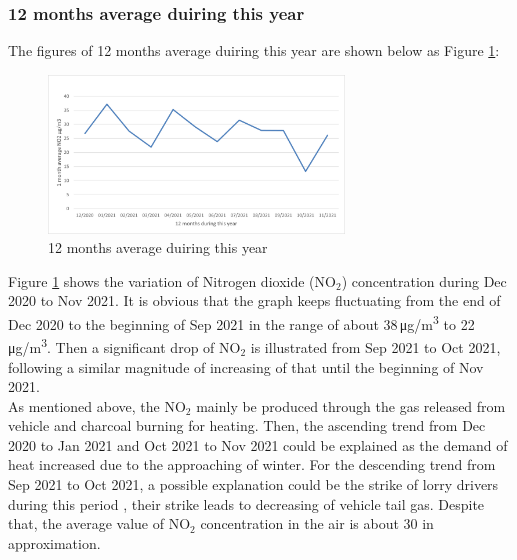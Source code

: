 \documentclass[a4paper,12pt,reqno]{article}
\begin{document}
    \subsubsection*{12 months average duiring this year}
        The figures of 12 months average duiring this year are shown below 
        as Figure \ref{fig:12_months_average_duiring_this_year}:
        \begin{figure}[H]
            \centering
            \includegraphics[width=0.7\textwidth]{figures/figure1.png}
            \caption{12 months average duiring this year}
            \label{fig:12_months_average_duiring_this_year}
        \end{figure}
        Figure \ref{fig:12_months_average_duiring_this_year} shows the variation of Nitrogen dioxide (NO$_2$) 
        concentration during Dec 2020 to Nov 2021. It is obvious 
        that the graph keeps fluctuating from the end of Dec 2020 
        to the beginning of Sep 2021 in the range of about 38\,\si{\ug/\m^3} 
        to 22\,\si{\ug/\m^3}. Then a significant drop of NO$_2$ is illustrated 
        from Sep 2021 to Oct 2021, following a similar magnitude of 
        increasing of that until the beginning of Nov 2021. \\
        As mentioned above, the NO$_2$ mainly be produced through the 
        gas released from vehicle and charcoal burning for heating. 
        Then, the ascending trend from Dec 2020 to Jan 2021 and 
        Oct 2021 to Nov 2021 could be explained as the demand of 
        heat increased due to the approaching of winter. For the 
        descending trend from Sep 2021 to Oct 2021, a possible 
        explanation could be the strike of lorry drivers during 
        this period \cite{Gareth}, their strike leads to decreasing of 
        vehicle tail gas. Despite that, the average value of NO$_2$ 
        concentration in the air is about 30 in approximation. 
\end{document}
